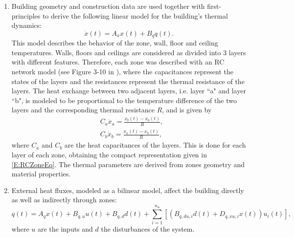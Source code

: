 \textcolor[rgb]{0,0,1}{\begin{enumerate}
		\item Building geometry and construction data are used together with first-principles to derive the following linear model for the building's thermal dynamics:
		\begin{equation}\label{E:RCZoneEq}
			\dot x(t) = A_x x(t) + B_q q(t).
		\end{equation}
		This model describes the behavior of the zone, wall, floor and ceiling temperatures.
		Walls, floors and ceilings are considered as divided into 3 layers with different features. Therefore, each zone was described with an RC network model (see Figure 3-10 in \cite{SturzeneggerTR}), where the capacitances represent the states of the layers and the resistances represent the thermal resistance of the layers.
		The heat exchange between two adjacent layers, i.e. layer ``a" and layer ``b", is modeled to be proportional to the temperature difference of the two layers and the corresponding thermal resistance $R$, and is given by
		\begin{equation}\label{E:RCHeatExchange}
			\begin{aligned}
				&C_a\dot x_a = \frac{x_b(t) - x_a(t)}{R},\\
				&C_b\dot x_b =  \frac{x_a(t) - x_b(t)}{R},
			\end{aligned}
		\end{equation}
		where $C_a$ and $C_b$ are the heat capacitances of the layers. This is done for each layer of each zone, obtaining the compact representation given in \eqref{E:RCZoneEq}. The thermal parameters are derived from zones geometry and material properties.
		\item External heat fluxes, modeled as a bilinear model, affect the building directly as well as indirectly through zones:
		\begin{equation}\label{E:RCfluxes}
			q(t) = A_q x(t) + B_{q,u}u(t) + B_{q,d}d(t) + \sum_{i=1}^{n_u}{[\left(B_{q,du,i}d(t) + D_{q,xu,i}x(t)\right)u_i(t)]},
		\end{equation}
		where $u$ are the inputs and $d$ the disturbances of the system.

\end{enumerate}}
